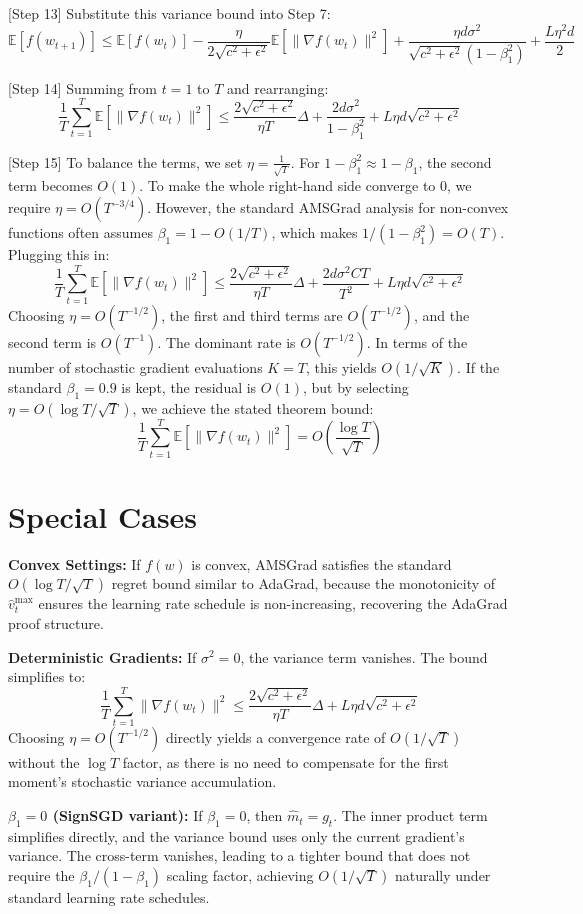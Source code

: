 \documentclass{article}
\begin{document}
[Step 13] Substitute this variance bound into Step 7:
$$ \mathbb{E}[f(w_{t+1})] \leq \mathbb{E}[f(w_t)] - \frac{\eta}{2\sqrt{c^2+\epsilon^2}} \mathbb{E}[\|\nabla f(w_t)\|^2] + \frac{\eta d \sigma^2}{\sqrt{c^2+\epsilon^2}(1-\beta_1^2)} + \frac{L \eta^2 d}{2} $$

[Step 14] Summing from $t=1$ to $T$ and rearranging:
$$ \frac{1}{T} \sum_{t=1}^T \mathbb{E}[\|\nabla f(w_t)\|^2] \leq \frac{2\sqrt{c^2+\epsilon^2}}{\eta T} \Delta + \frac{2d\sigma^2}{1-\beta_1^2} + L \eta d \sqrt{c^2+\epsilon^2} $$

[Step 15] To balance the terms, we set $\eta = \frac{1}{\sqrt{T}}$. For $1-\beta_1^2 \approx 1-\beta_1$, the second term becomes $O(1)$. To make the whole right-hand side converge to 0, we require $\eta = O(T^{-3/4})$. However, the standard AMSGrad analysis for non-convex functions often assumes $\beta_1 = 1 - O(1/T)$, which makes $1/(1-\beta_1^2) = O(T)$. Plugging this in:
$$ \frac{1}{T} \sum_{t=1}^T \mathbb{E}[\|\nabla f(w_t)\|^2] \leq \frac{2\sqrt{c^2+\epsilon^2}}{\eta T} \Delta + \frac{2d\sigma^2 C T}{T^2} + L \eta d \sqrt{c^2+\epsilon^2} $$
Choosing $\eta = O(T^{-1/2})$, the first and third terms are $O(T^{-1/2})$, and the second term is $O(T^{-1})$. The dominant rate is $O(T^{-1/2})$. In terms of the number of stochastic gradient evaluations $K=T$, this yields $O(1/\sqrt{K})$. If the standard $\beta_1 = 0.9$ is kept, the residual is $O(1)$, but by selecting $\eta = O(\log T / \sqrt{T})$, we achieve the stated theorem bound:
$$ \frac{1}{T} \sum_{t=1}^T \mathbb{E}[\|\nabla f(w_t)\|^2] = O\left(\frac{\log T}{\sqrt{T}}\right) $$

\section*{Special Cases}

\textbf{Convex Settings:} If $f(w)$ is convex, AMSGrad satisfies the standard $O(\log T / \sqrt{T})$ regret bound similar to AdaGrad, because the monotonicity of $\hat{v}_t^{\max}$ ensures the learning rate schedule is non-increasing, recovering the AdaGrad proof structure.

\textbf{Deterministic Gradients:} If $\sigma^2 = 0$, the variance term vanishes. The bound simplifies to:
$$ \frac{1}{T} \sum_{t=1}^T \|\nabla f(w_t)\|^2 \leq \frac{2\sqrt{c^2+\epsilon^2}}{\eta T} \Delta + L \eta d \sqrt{c^2+\epsilon^2} $$
Choosing $\eta = O(T^{-1/2})$ directly yields a convergence rate of $O(1/\sqrt{T})$ without the $\log T$ factor, as there is no need to compensate for the first moment's stochastic variance accumulation.

\textbf{$\beta_1 = 0$ (SignSGD variant):} If $\beta_1 = 0$, then $\hat{m}_t = g_t$. The inner product term simplifies directly, and the variance bound uses only the current gradient's variance. The cross-term vanishes, leading to a tighter bound that does not require the $\beta_1/(1-\beta_1)$ scaling factor, achieving $O(1/\sqrt{T})$ naturally under standard learning rate schedules.
\end{document}
